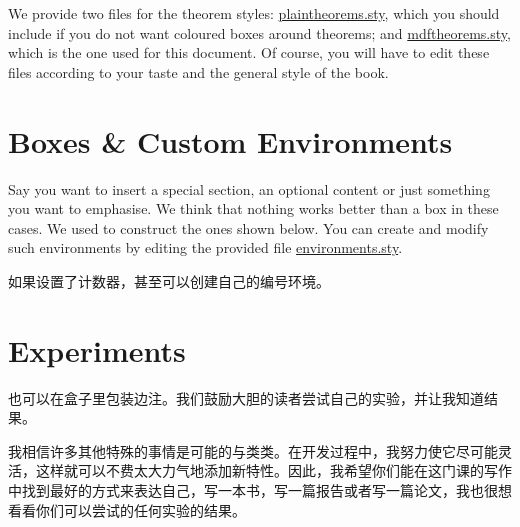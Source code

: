 We provide two files for the theorem styles: 
\href{style/plaintheorems.sty}{plaintheorems.sty}, which you should 
include if you do not want coloured boxes around theorems; and 
\href{style/mdftheorems.sty}{mdftheorems.sty}, which is the one used for 
this document. Of course, 
you will have to edit these files according to your taste and the 
general style of the book.

\section[Boxes \& Environments]{Boxes \& Custom Environments
}

Say you want to insert a special section, an optional content or just 
something you want to emphasise. We think that nothing works better than 
a box in these cases. We used  to construct the ones 
shown below. You can create and modify such environments by editing the 
provided file \href{style/environments.sty}{environments.sty}.

\begin{kaobox}[frametitle=盒子标题]
\zhlipsum[3]
\end{kaobox}

如果设置了计数器，甚至可以创建自己的编号环境。

\begin{kaocounter}
\zhlipsum[4]
\end{kaocounter}

\section{Experiments}

也可以在盒子里包装边注。我们鼓励大胆的读者尝试自己的实验，并让我知道结果。


我相信许多其他特殊的事情是可能的与类类。在开发过程中，我努力使它尽可能灵活，这样就可以不费太大力气地添加新特性。因此，我希望你们能在这门课的写作中找到最好的方式来表达自己，写一本书，写一篇报告或者写一篇论文，我也很想看看你们可以尝试的任何实验的结果。

